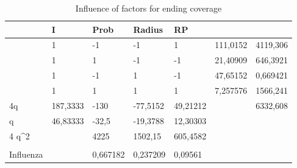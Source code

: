 \begin{table}[h!]
\centering
\begin{tabular}{|l|l|l|l|l|l|l|}
\hline
                       & I        & Prob     & Radius   & RP       &          &          \\ \hline
                       & 1        & -1       & -1       & 1        & 111,0152 & 4119,306 \\ \hline
                       & 1        & 1        & -1       & -1       & 21,40909 & 646,3921 \\ \hline
                       & 1        & -1       & 1        & -1       & 47,65152 & 0,669421 \\ \hline
                       & 1        & 1        & 1        & 1        & 7,257576 & 1566,241 \\ \hline
4q                     & 187,3333 & -130     & -77,5152 & 49,21212 &          & 6332,608 \\ \hline
q                      & 46,83333 & -32,5    & -19,3788 & 12,30303 &          &          \\ \hline
4 q\textasciicircum{}2 &          & 4225     & 1502,15  & 605,4582 &          &          \\ \hline
                       &          &          &          &          &          &          \\ \hline
Influenza              &          & 0,667182 & 0,237209 & 0,09561  &          &          \\ \hline
\end{tabular}
\caption{Influence of factors for ending coverage}
\label{tab:influence-on-completion-time}
\end{table}
